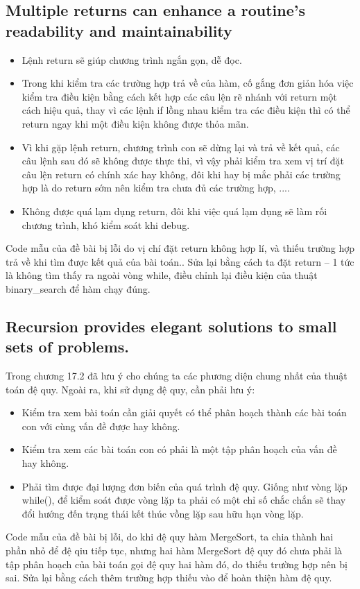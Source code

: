 \documentclass{article}
\begin{document}
    \subsection{Multiple returns can enhance a routine's readability and maintainability}
    \begin{itemize}
        \item Lệnh return sẽ giúp chương trình ngắn gọn, dễ đọc.
        \item Trong khi kiểm tra các trường hợp trả về của hàm, cố gắng đơn giản hóa việc kiểm tra điều kiện bằng cách kết hợp các câu lện rẽ nhánh với return một cách hiệu quả, thay vì các lệnh if lồng nhau kiểm tra các điều kiện thì có thể return ngay khi một điều kiện không được thỏa mãn.
        \item Vì khi gặp lệnh return, chương trình con sẽ dừng lại và trả về kết quả, các câu lệnh sau đó sẽ không được thực thi, vì vậy phải kiểm tra xem vị trí đặt câu lện return có chính xác hay không, đôi khi hay bị mắc phải các trường hợp là do return sớm nên kiểm tra chưa đủ các trường hợp, ....
        \item Không được quá lạm dụng return, đôi khi việc quá lạm dụng sẽ làm rối chương trình, khó kiểm soát khi debug.
    \end{itemize}
    Code mẫu của đề bài bị lỗi do vị chí đặt return không hợp lí, và thiếu trường hợp trả về khi tìm được kết quả của bài toán.. Sửa lại bằng cách ta đặt return – 1 tức là không tìm thấy ra ngoài vòng while, điều chỉnh lại điều kiện của thuật binary\_search để hàm chạy đúng.
    
    \subsection{Recursion provides elegant solutions to small sets of problems.}
    Trong chương 17.2 đã lưu ý cho chúng ta các phương diện chung nhất của thuật toán đệ quy.
    Ngoài ra, khi sử dụng đệ quy, cần phải lưu ý:
    \begin{itemize}
        \item Kiểm tra xem bài toán cần giải quyết có thể phân hoạch thành các bài toán con với cùng vấn đề được hay không.
        \item Kiểm tra xem các bài toán con có phải là một tập phân hoạch của vấn đề hay không.
        \item Phải tìm được đại lượng đơn biến của quá trình đệ quy. Giống như vòng lặp while(), để kiểm soát được vòng lặp ta phải có một chỉ số chắc chắn sẽ thay đổi hướng đến trạng thái kết thúc vồng lặp sau hữu hạn vòng lặp. 
    \end{itemize}
    Code mẫu của đề bài bị lỗi, do khi đệ quy hàm MergeSort, ta chia thành hai phần nhỏ để đệ qiu tiếp tục, nhưng hai hàm MergeSort đệ quy đó chưa phải là tập phân hoạch của bài toán gọi đệ quy hai hàm đó, do thiếu trường hợp nên bị sai. Sửa lại bằng cách thêm trường hợp thiếu vào để hoàn thiện hàm đệ quy.
    
\end{document}
